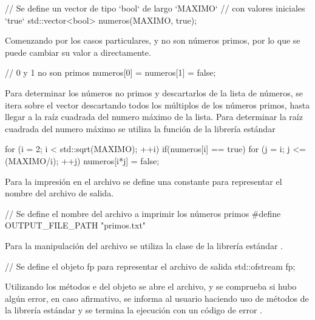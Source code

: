 \documentclass[12pt]{article}
\newenvironment{fullgrayverb}
{\verbbox}
{\endverbbox\par\colorbox{gray!25}{\parbox{\textwidth}{\theverbbox}}\par}
\begin{document}
\begin{fullgrayverb}[\mbox{}]
// Se define un vector de tipo `bool` de largo `MAXIMO`
// con valores iniciales `true`
std::vector<bool> numeros(MAXIMO, true);
\end{fullgrayverb}

Comenzando por los casos particulares,  y  no son números
primos, por lo que se puede cambiar su valor a  directamente.

\begin{fullgrayverb}[\mbox{}]
// 0 y 1 no son primos
numeros[0] = numeros[1] = false;
\end{fullgrayverb}

Para determinar los números no primos y descartarlos de la lista de números, se
itera sobre el vector descartando todos los múltiplos de los números primos,
hasta llegar a la raíz cuadrada del numero máximo de la lista. Para determinar
la raíz cuadrada del numero máximo se utiliza la función
 de la librería estándar  

\begin{fullgrayverb}[\mbox{}]
for (i = 2; i < std::sqrt(MAXIMO); ++i) {
    if(numeros[i] == true) {
        for (j = i; j <= (MAXIMO/i); ++j) {
            numeros[i*j] = false;
        }
    }
}
\end{fullgrayverb}

\pagebreak
Para la impresión en el archivo se define una constante para representar el
nombre del archivo de salida.

\begin{fullgrayverb}[\mbox{}]
// Se define el nombre del archivo a imprimir los números primos
#define OUTPUT_FILE_PATH "primos.txt"
\end{fullgrayverb}

Para la manipulación del archivo se utiliza la clase  de la
librería estándar .

\begin{fullgrayverb}[\mbox{}]
// Se define el objeto fp para representar el archivo de salida
std::ofstream fp;
\end{fullgrayverb}

Utilizando los métodos  e  del objeto  se abre
el archivo, y se comprueba si hubo algún error, en caso afirmativo, se informa
al usuario haciendo uso de métodos de la librería estándar  y se
termina la ejecución con un código de error .
\end{document}
